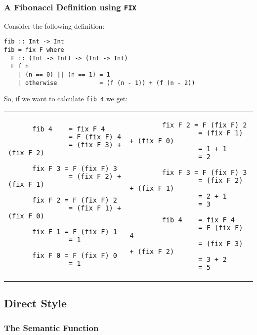 \subsubsection{A Fibonacci Definition using \texttt{FIX}}

Consider the following definition:

\begin{lstlisting}
fib :: Int -> Int
fib = fix F where
  F :: (Int -> Int) -> (Int -> Int)
  F f n
    | (n == 0) || (n == 1) = 1
    | otherwise            = (f (n - 1)) + (f (n - 2))
\end{lstlisting}

So, if we want to calculate \texttt{fib 4} we get: \begin{center}
  \begin{tabular}{ l l }
    \begin{lstlisting}
      fib 4    = fix F 4
               = F (fix F) 4
               = (fix F 3) + (fix F 2)
      
      fix F 3 = F (fix F) 3
               = (fix F 2) + (fix F 1)
      
      fix F 2 = F (fix F) 2
               = (fix F 1) + (fix F 0)
      
      fix F 1 = F (fix F) 1
               = 1
      
      fix F 0 = F (fix F) 0
               = 1
      \end{lstlisting}
      &
      \begin{lstlisting}
        fix F 2 = F (fix F) 2
                 = (fix F 1) + (fix F 0)
                 = 1 + 1
                 = 2
        
        fix F 3 = F (fix F) 3
                 = (fix F 2) + (fix F 1)
                 = 2 + 1
                 = 3
        
        fib 4    = fix F 4
                 = F (fix F) 4
                 = (fix F 3) + (fix F 2)
                 = 3 + 2
                 = 5
      \end{lstlisting}
  \end{tabular}
\end{center}

\newpage

\subsection{Direct Style}

\subsubsection{The Semantic Function} 

